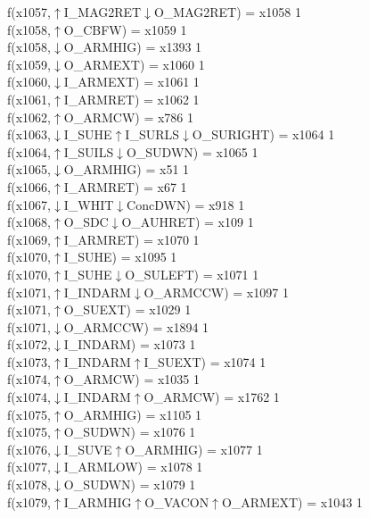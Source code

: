 f(x1057,$\uparrow$I\_MAG2RET$\downarrow$O\_MAG2RET) = x1058 {1} \\
f(x1058,$\uparrow$O\_CBFW) = x1059 {1} \\
f(x1058,$\downarrow$O\_ARMHIG) = x1393 {1} \\
f(x1059,$\downarrow$O\_ARMEXT) = x1060 {1} \\
f(x1060,$\downarrow$I\_ARMEXT) = x1061 {1} \\
f(x1061,$\uparrow$I\_ARMRET) = x1062 {1} \\
f(x1062,$\uparrow$O\_ARMCW) = x786 {1} \\
f(x1063,$\downarrow$I\_SUHE$\uparrow$I\_SURLS$\downarrow$O\_SURIGHT) = x1064 {1} \\
f(x1064,$\uparrow$I\_SUILS$\downarrow$O\_SUDWN) = x1065 {1} \\
f(x1065,$\downarrow$O\_ARMHIG) = x51 {1} \\
f(x1066,$\uparrow$I\_ARMRET) = x67 {1} \\
f(x1067,$\downarrow$I\_WHIT$\downarrow$ConcDWN) = x918 {1} \\
f(x1068,$\uparrow$O\_SDC$\downarrow$O\_AUHRET) = x109 {1} \\
f(x1069,$\uparrow$I\_ARMRET) = x1070 {1} \\
f(x1070,$\uparrow$I\_SUHE) = x1095 {1} \\
f(x1070,$\uparrow$I\_SUHE$\downarrow$O\_SULEFT) = x1071 {1} \\
f(x1071,$\uparrow$I\_INDARM$\downarrow$O\_ARMCCW) = x1097 {1} \\
f(x1071,$\uparrow$O\_SUEXT) = x1029 {1} \\
f(x1071,$\downarrow$O\_ARMCCW) = x1894 {1} \\
f(x1072,$\downarrow$I\_INDARM) = x1073 {1} \\
f(x1073,$\uparrow$I\_INDARM$\uparrow$I\_SUEXT) = x1074 {1} \\
f(x1074,$\uparrow$O\_ARMCW) = x1035 {1} \\
f(x1074,$\downarrow$I\_INDARM$\uparrow$O\_ARMCW) = x1762 {1} \\
f(x1075,$\uparrow$O\_ARMHIG) = x1105 {1} \\
f(x1075,$\uparrow$O\_SUDWN) = x1076 {1} \\
f(x1076,$\downarrow$I\_SUVE$\uparrow$O\_ARMHIG) = x1077 {1} \\
f(x1077,$\downarrow$I\_ARMLOW) = x1078 {1} \\
f(x1078,$\downarrow$O\_SUDWN) = x1079 {1} \\
f(x1079,$\uparrow$I\_ARMHIG$\uparrow$O\_VACON$\uparrow$O\_ARMEXT) = x1043 {1} \\
